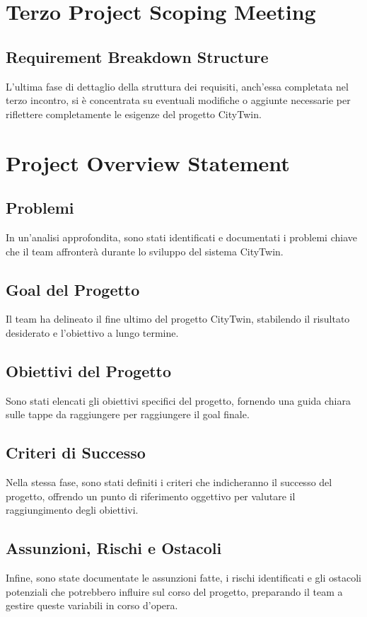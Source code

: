\section{Terzo Project Scoping Meeting}

\subsection{Requirement Breakdown Structure}

L'ultima fase di dettaglio della struttura dei requisiti, anch'essa completata nel terzo incontro, si è concentrata su eventuali modifiche o aggiunte necessarie per riflettere completamente le esigenze del progetto CityTwin.

\section{Project Overview Statement}

\subsection{Problemi}

In un'analisi approfondita, sono stati identificati e documentati i problemi chiave che il team affronterà durante lo sviluppo del sistema CityTwin.

\subsection{Goal del Progetto}

Il team ha delineato il fine ultimo del progetto CityTwin, stabilendo il risultato desiderato e l'obiettivo a lungo termine.

\subsection{Obiettivi del Progetto}

Sono stati elencati gli obiettivi specifici del progetto, fornendo una guida chiara sulle tappe da raggiungere per raggiungere il goal finale.

\subsection{Criteri di Successo}

Nella stessa fase, sono stati definiti i criteri che indicheranno il successo del progetto, offrendo un punto di riferimento oggettivo per valutare il raggiungimento degli obiettivi.

\subsection{Assunzioni, Rischi e Ostacoli}

Infine, sono state documentate le assunzioni fatte, i rischi identificati e gli ostacoli potenziali che potrebbero influire sul corso del progetto, preparando il team a gestire queste variabili in corso d'opera.
